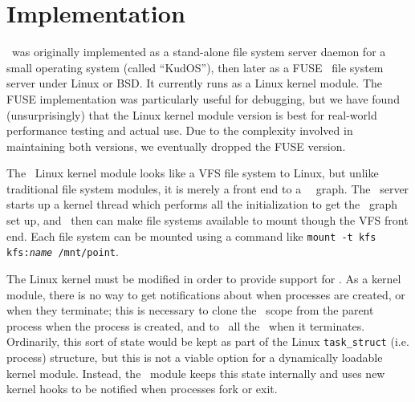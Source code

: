 \section{Implementation}
\label{sec:implementation}

\Kudos\ was originally implemented as a stand-alone file system server daemon
for a small operating system (called ``KudOS''), then later as a
FUSE~\cite{fuse} file system server under Linux or BSD. It currently runs as a
Linux kernel module. The FUSE implementation was particularly useful for
debugging, but we have found (unsurprisingly) that the Linux kernel module
version is best for real-world performance testing and actual use. Due to the
complexity involved in maintaining both versions, we eventually dropped the
FUSE version.

The \Kudos\ Linux kernel module looks like a VFS file system to Linux, but
unlike traditional file system modules,
it is merely a front end to a \Kudos\ \module\ graph. The \Kudos\
server starts up a kernel thread which performs all the initialization to get
the \module\ graph set up, and \modules\ then can make file systems available to
mount though the VFS front end. Each file system can be mounted using a
command like \mbox{\texttt{mount -t kfs kfs:\textit{name} /mnt/point}}.

The Linux kernel must be modified in order to
provide support for \opgroups.  As a kernel module, there is no way to
get notifications about when processes are created, or when they terminate; this
is necessary to clone the \opgroup\ scope 
from the parent process when the process is created, and to \abandon\ all
the \opgroups\ when it terminates. Ordinarily, this sort of state would be kept
as part of the Linux \texttt{task\_struct} (i.e. process) structure, but this is
not a viable option for a dynamically loadable kernel module. Instead, the
\Kudos\ module keeps this state internally and uses new kernel hooks
to be notified when processes fork or exit. 

